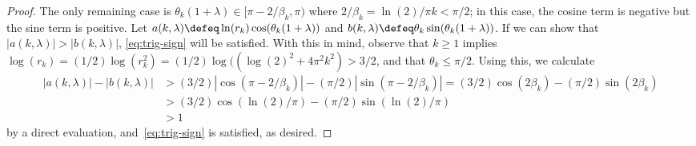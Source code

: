 \begin{proof}
    The only remaining case is $\theta_k(1+\lambda) \in [\pi - 2/\beta_k, \pi)$ where $2/\beta_k = \ln(2)/\pi k < \pi/2$; 
    in this case, the cosine term is negative but the sine term is positive.
    Let $a(k, \lambda) \defeq \ln(r_k) \cos(\theta_k(1+\lambda))$ 
    and $b(k, \lambda) \defeq \theta_k \sin(\theta_k(1+\lambda))$. 
    If we can show that $\vert a(k, \lambda) \vert > \vert b(k, \lambda) \vert$, 
    \eqref{eq:trig-sign} will be satisfied. 
    With this in mind, observe that $k \geq 1$ implies 
    $\log(r_k) = (1/2) \log(r_k^2) = (1/2) \log( (\log(2)^2 + 4 \pi^2 k^2) > 3/2$, 
    and that $\theta_k \leq \pi/2$.
    Using this, we calculate
    \begin{align*}
        | a(k, \lambda) | - | b(k, \lambda)| 
        &> (3/2) |\cos(\pi - 2/\beta_k)| - (\pi/2) |\sin(\pi - 2/\beta_k)| 
        = (3/2) \cos(2\beta_k) - (\pi/2)\sin(2\beta_k) \\
        &> (3/2) \cos(\ln(2)/\pi) - (\pi/2)\sin(\ln(2)/\pi) \\
        &> 1 
    \end{align*}
    by a direct evaluation, and~\eqref{eq:trig-sign} is satisfied, as desired.
\end{proof}





